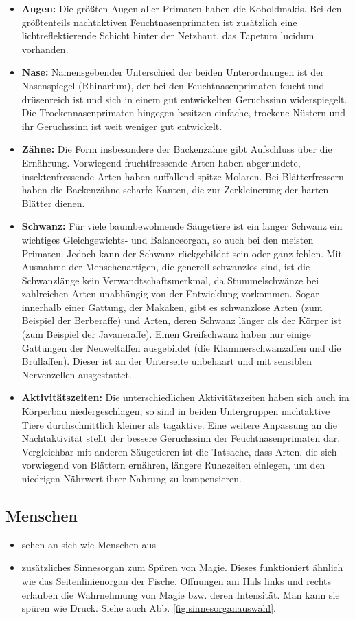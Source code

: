 \begin{itemize}
	\item \textbf{Augen:} Die größten Augen aller Primaten haben die Koboldmakis. Bei den größtenteils nachtaktiven Feuchtnasenprimaten ist zusätzlich eine lichtreflektierende Schicht hinter der Netzhaut, das Tapetum lucidum vorhanden.
	\item \textbf{Nase:} Namensgebender Unterschied der beiden Unterordnungen ist der Nasenspiegel (Rhinarium), der bei den Feuchtnasenprimaten feucht und drüsenreich ist und sich in einem gut entwickelten Geruchssinn widerspiegelt. Die Trockennasenprimaten hingegen besitzen einfache, trockene Nüstern und ihr Geruchssinn ist weit weniger gut entwickelt. 
	\item \textbf{Zähne:} Die Form insbesondere der Backenzähne gibt Aufschluss über die Ernährung. Vorwiegend fruchtfressende Arten haben abgerundete, insektenfressende Arten haben auffallend spitze Molaren. Bei Blätterfressern haben die Backenzähne scharfe Kanten, die zur Zerkleinerung der harten Blätter dienen. 
	\item \textbf{Schwanz:} Für viele baumbewohnende Säugetiere ist ein langer Schwanz ein wichtiges Gleichgewichts- und Balanceorgan, so auch bei den meisten Primaten. Jedoch kann der Schwanz rückgebildet sein oder ganz fehlen. Mit Ausnahme der Menschenartigen, die generell schwanzlos sind, ist die Schwanzlänge kein Verwandtschaftsmerkmal, da Stummelschwänze bei zahlreichen Arten unabhängig von der Entwicklung vorkommen. Sogar innerhalb einer Gattung, der Makaken, gibt es schwanzlose Arten (zum Beispiel der Berberaffe) und Arten, deren Schwanz länger als der Körper ist (zum Beispiel der Javaneraffe). Einen Greifschwanz haben nur einige Gattungen der Neuweltaffen ausgebildet (die Klammerschwanzaffen und die Brüllaffen). Dieser ist an der Unterseite unbehaart und mit sensiblen Nervenzellen ausgestattet.
	\item \textbf{Aktivitätszeiten:} Die unterschiedlichen Aktivitätszeiten haben sich auch im Körperbau niedergeschlagen, so sind in beiden Untergruppen nachtaktive Tiere durchschnittlich kleiner als tagaktive. Eine weitere Anpassung an die Nachtaktivität stellt der bessere Geruchssinn der Feuchtnasenprimaten dar. Vergleichbar mit anderen Säugetieren ist die Tatsache, dass Arten, die sich vorwiegend von Blättern ernähren, längere Ruhezeiten einlegen, um den niedrigen Nährwert ihrer Nahrung zu kompensieren. 
\end{itemize}


\subsection{Menschen} \label{rasse:mensch}
\begin{itemize}
	\item sehen an sich wie Menschen aus
	\item zusätzliches Sinnesorgan zum Spüren von Magie. Dieses funktioniert ähnlich wie das Seitenlinienorgan der Fische. Öffnungen am Hals links und rechts erlauben die Wahrnehmung von Magie bzw. deren Intensität. Man kann sie spüren wie Druck. Siehe auch Abb. \ref{fig:sinnesorganauswahl}.
\end{itemize}

